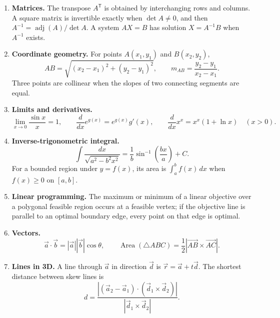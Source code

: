 \begin{enumerate}[label=\textbf{1.1.\arabic*.},ref=1.1.\arabic*]
\setlength{\itemsep}{0.35em}
\item \label{formula-1-1-1} \textbf{Matrices.} The transpose $A^{\mathsf T}$ is obtained by interchanging rows and columns. A square matrix is invertible exactly when $\det A\ne0$, and then $A^{-1}=\operatorname{adj}(A)/\det A$. A system $AX=B$ has solution $X=A^{-1}B$ when $A^{-1}$ exists.
\item \label{formula-1-1-2} \textbf{Coordinate geometry.} For points $A(x_1,y_1)$ and $B(x_2,y_2)$,
\begin{equation*}\tag{1.1.2.1}
AB=\sqrt{(x_2-x_1)^2+(y_2-y_1)^2},\qquad
m_{AB}=\frac{y_2-y_1}{x_2-x_1}.
\end{equation*}
Three points are collinear when the slopes of two connecting segments are equal.
\item \label{formula-1-1-3} \textbf{Limits and derivatives.}
\begin{equation*}\tag{1.1.3.1}
\lim_{x\to0}\frac{\sin x}{x}=1,\qquad
\frac{d}{dx}e^{g(x)}=e^{g(x)}g'(x),\qquad
\frac{d}{dx}x^x=x^x(1+\ln x)\quad(x>0).
\end{equation*}
\item \label{formula-1-1-4} \textbf{Inverse-trigonometric integral.}
\begin{equation*}\tag{1.1.4.1}
\int\frac{dx}{\sqrt{a^2-b^2x^2}}=\frac1b\sin^{-1}\!\left(\frac{bx}{a}\right)+C.
\end{equation*}
For a bounded region under $y=f(x)$, its area is $\int_a^b f(x)\,dx$ when $f(x)\ge0$ on $[a,b]$.
\item \label{formula-1-1-5} \textbf{Linear programming.} The maximum or minimum of a linear objective over a polygonal feasible region occurs at a feasible vertex; if the objective line is parallel to an optimal boundary edge, every point on that edge is optimal.
\item \label{formula-1-1-6} \textbf{Vectors.}
\begin{equation*}\tag{1.1.6.1}
\vec a\cdot\vec b=|\vec a||\vec b|\cos\theta,\qquad
\operatorname{Area}(\triangle ABC)=\frac12|\overrightarrow{AB}\times\overrightarrow{AC}|.
\end{equation*}
\item \label{formula-1-1-7} \textbf{Lines in 3D.} A line through $\vec a$ in direction $\vec d$ is $\vec r=\vec a+t\vec d$. The shortest distance between skew lines is
\begin{equation*}\tag{1.1.7.1}
d=\frac{|(\vec a_2-\vec a_1)\cdot(\vec d_1\times\vec d_2)|}{|\vec d_1\times\vec d_2|}.

\end{equation*}
\end{enumerate}
